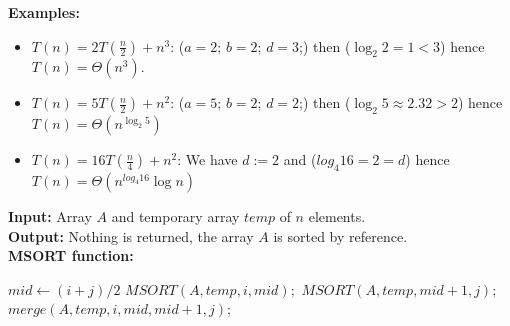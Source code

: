 \textbf{Examples:}
\begin{itemize}
    \item $T(n) = 2T\left(\frac{n}{2}\right) + n^3$: ($a=2$; $b=2$; $d=3$;) then ($\log_2 2 = 1 < 3$) hence $T(n) = \Theta(n^3)$.
    \item $T(n) = 5T\left(\frac{n}{2}\right) + n^2$: ($a=5$; $b=2$; $d=2$;) then ($\log_2 5 \approx 2.32 > 2$) hence $T(n) = \Theta(n^{\log_2 5})$
    \item $T(n) = 16T\left(\frac{n}{4}\right) + n^2$: We have $d:=2$ and ($log_4 16=2=d$) hence $T(n) = \Theta(n^{log_4 16}\log n)$ 
\end{itemize}

\newpage

\begin{Func}
    \textbf{Input:} Array $A$ and temporary array $temp$ of $n$ elements.\\
    \textbf{Output:} Nothing is returned, the array $A$ is sorted by reference.\\

    \vspace{-.5em}
    \noindent
    \textbf{MSORT function:}\\
    \begin{algorithm}[H]
        \label{algo:mergesort}
            $mid \gets (i + j) / 2$\;
            $MSORT(A, temp, i, mid);$ 
            $MSORT(A, temp, mid + 1, j);$ 
            $merge(A, temp, i, mid, mid + 1, j);$ 
        
    \end{algorithm}
\end{Func}

